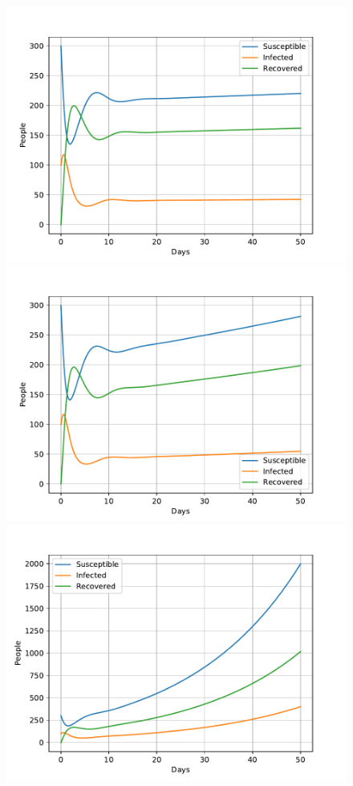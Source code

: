 \documentclass[a4paper]{article}
\begin{document}
\begin{figure}[!htb]
	\centering 
	\includegraphics[scale=0.56]{../plots/opp_c_h_10000.pdf}
	\includegraphics[scale=0.56]{../plots/opp_c_h_20000.pdf}	
	\includegraphics[scale=0.56]{../plots/opp_c_h_100000.pdf} %

\end{figure}
\end{document}

